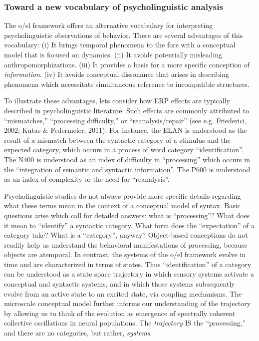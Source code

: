 \subsubsection{Toward a new vocabulary of psycholinguistic analysis}

The o/el framework offers an alternative vocabulary for interpreting psycholinguistic observations of behavior. There are several advantages of this vocabulary: (i) It brings temporal phenomena to the fore with a conceptual model that is focused on dynamics. (ii) It avoids potentially misleading anthropomorphizations. (iii) It provides a basis for a more specific conception of \textit{information}. (iv) It avoids conceptual dissonance that arises in describing phenomena which necessitate simultaneous reference to incompatible structures.

To illustrate these advantages, lets consider how ERP effects are typically described in psycholinguistic literature. Such effects are commonly attributed to “mismatches,” “processing difficulty,” or “reanalysis/repair” (see e.g. Friederici, 2002; Kutas \& Federmeier, 2011). For instance, the ELAN is understood as the result of a mismatch between the syntactic category of a stimulus and the expected category, which occurs in a process of word category “identification”. The N400 is understood as an index of difficulty in “processing” which occurs in the “integration of semantic and syntactic information”. The P600 is understood as an index of complexity or the need for “reanalysis”.

Psycholinguistic studies do not always provide more specific details regarding what these terms mean in the context of a conceptual model of syntax. Basic questions arise which call for detailed answers: what is “processing”? What does it mean to “identify” a syntactic category. What form does the “expectation” of a category take? What is a “category”, anyway? Object-based conceptions do not readily help us understand the behavioral manifestations of processing, because objects are atemporal. In contrast, the systems of the o/el framework evolve in time and are characterized in terms of states. Thus “identification” of a category can be understood as a state space trajectory in which sensory systems activate a conceptual and syntactic systems, and in which those systems subsequently evolve from an active state to an excited state, via coupling mechanisms. The microscale conceptual model further informs our understanding of the trajectory by allowing us to think of the evolution as emergence of spectrally coherent collective oscillations in neural populations. The \textit{trajectory} IS the “processing,” and there are no categories, but rather, \textit{systems}.


